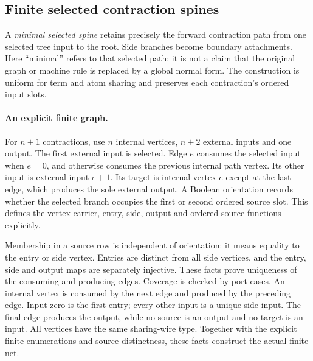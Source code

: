 
\subsection{Finite selected contraction spines}
A \emph{minimal selected spine} retains precisely the forward contraction
path from one selected tree input to the root. Side branches become boundary
attachments. Here ``minimal'' refers to that selected path; it is not a
claim that the original graph or machine rule is replaced by a global
normal form. The construction is uniform for term and atom sharing and
preserves each contraction's ordered input slots.

\paragraph{An explicit finite graph.}
For $n+1$ contractions, use $n$ internal vertices, $n+2$ external inputs and
one output. The first external input is selected. Edge $e$ consumes the
selected input when $e=0$, and otherwise consumes the previous internal path
vertex. Its other input is external input $e+1$. Its target is internal
vertex $e$ except at the last edge, which produces the sole external output.
A Boolean orientation records whether the selected branch occupies the
first or second ordered source slot. This defines the vertex carrier,
entry, side, output and ordered-source functions explicitly.

\par{}
\par{}

Membership in a source row is independent of orientation: it means equality
to the entry or side vertex. Entries are distinct from all side vertices,
and the entry, side and output maps are separately injective. These facts
prove uniqueness of the consuming and producing edges. Coverage is checked
by port cases. An internal vertex is consumed by the next edge and produced
by the preceding edge. Input zero is the first entry; every other input is
a unique side input. The final edge produces the output, while no source is
an output and no target is an input. All vertices have the same sharing-wire
type. Together with the explicit finite enumerations and source distinctness,
these facts construct the actual finite net.

